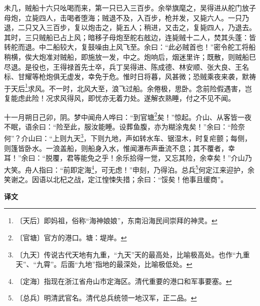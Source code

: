 \documentclass[12pt,UTF-8,openany,a4]{ctexbook}
\begin{document}
\begin{large}
    未几，贼船十六只吆喝而来，第一只已入三百步。余举旗麾之，吴得进从舵门放子母炮，立毙四人，击喝者堕海；贼退不及，入百步，枪并发，又毙六人。一只乃退，二只又入三百步，复以炮击之，毙五人；稍进，又击之，复毙四人，乃退去。其时，三只贼船已占上风；暗移子母炮至舵右舷边，连毙贼十二人，焚其头蓬：皆转舵而退。中二船较大，复鼓噪由上风飞至。余曰：“此必贼首也！”密令舵工将船稍横，俟大炮准对贼船，即施放一发，中之。炮响后，烟迷里许；既散，则贼船巳尽退。是役也，王得禄首先士卒，兵丁吴得进、陈成德、林安顺、张大良、王名标、甘耀等枪炮俱无虚发，幸免于危。惟时日将暮，风甚微；恐贼乘夜来袭，默祷于天后\footnote{〔天后〕\yiwen 即妈祖，俗称“海神娘娘”，东南沿海民间崇拜的神灵。}求风。不一时，北风大至，浪飞过船。余倦极，思卧。念前险假遇害，岂复能虑此险！况求风得风，即忧亦无着力处。遂解衣熟睡，付之不见不闻。
    
    十一月朔日己卯，阴。梦中闻舟人哗曰：“到官塘\footnote{〔官塘〕\yiwen 官方的港口。塘：堤岸。}矣！”惊起。介山、从客皆一夜不眠，语余曰：“险至此，服汝能睡。设葬鱼腹，亦为糊涂鬼矣！”余曰：“险奈何”？介山曰：“上则九天\footnote{〔九天〕\yiwen 传说古代天地有九重，“九天”天的最高处，比喻极高处。也作“九重天”、“九霄”。后面“九地”指地的最深处，比喻极低处。}，下则九地，声如转水车、锯湿木，时复疟颤；每侧，则篷皆卧水。一浪盖船，则船身入水，惟闻瀑布声垂流不息；其不覆者，幸耳！”余曰：“脱覆，君等能免之乎！余乐拾得一觉，又忘其险，余幸矣！”介山乃大笑。舟人指曰：“前即定海\footnote{〔定海〕\yiwen 指现在浙江省舟山市定海区。清代重要的港口和军事要塞。}，可无虑！”申刻，乃得泊。总兵\footnote{〔总兵〕\yiwen 明清武官名。清代总兵统领一地汉军，正二品。}何定江来迎护，余笑谢之。因语以北杞之战，定江惶悚失措；余曰：“馁矣！他事且缓商”。
\end{large}


\newpage

\begin{Large}
    \noindent\textbf{译文}
\end{Large}


\vspace{1em}
\end{document}
